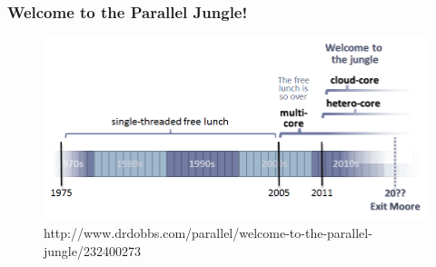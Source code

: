 \documentclass[12pt]{beamer}
\begin{document}
\begin{frame}
\frametitle{Welcome to the Parallel Jungle!}
\begin{figure}
\includegraphics[width=\textwidth]{img/sutter.png}
\caption{http://www.drdobbs.com/parallel/welcome-to-the-parallel-jungle/232400273}
\end{figure}
\end{frame}
\end{document}
